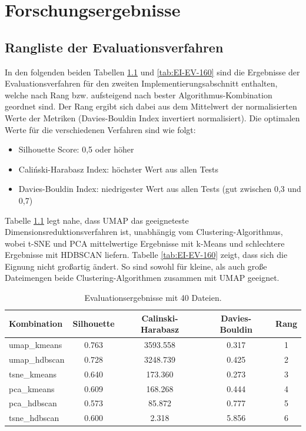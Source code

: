 \chapter{Forschungsergebnisse}

\section{Rangliste der Evaluationsverfahren}
In den folgenden beiden Tabellen \ref{tab:EI-EV-20} und \ref{tab:EI-EV-160} sind die Ergebnisse der Evaluationsverfahren für den zweiten Implementierungsabschnitt enthalten, welche nach Rang bzw. aufsteigend nach bester Algorithmus-Kombination geordnet sind. Der Rang ergibt sich dabei aus dem Mittelwert der normalisierten Werte der Metriken (Davies-Bouldin Index invertiert normalisiert). Die optimalen Werte für die verschiedenen Verfahren sind wie folgt:
\begin{itemize}
    \item Silhouette Score: 0,5 oder höher
    \item Caliński-Harabasz Index: höchster Wert aus allen Tests
    \item Davies-Bouldin Index: niedrigester Wert aus allen Tests (gut zwischen 0,3 und 0,7)
\end{itemize}
Tabelle \ref{tab:EI-EV-20} legt nahe, dass UMAP das geeigneteste Dimensionsreduktionsverfahren ist, unabhängig vom Clustering-Algorithmus, wobei t-SNE und PCA mittelwertige Ergebnisse mit k-Means und schlechtere Ergebnisse mit HDBSCAN liefern.
Tabelle \ref{tab:EI-EV-160} zeigt, dass sich die Eignung nicht großartig ändert. So sind sowohl für kleine, als auch große Dateimengen beide Clustering-Algorithmen zusammen mit UMAP geeignet.

\setlength{\tabcolsep}{5.5pt}
\begin{table}[h]
\centering
\begin{tabular}{lcccc}
\hline
\textbf{Kombination} & \textbf{Silhouette} & \textbf{Calinski-Harabasz} & \textbf{Davies-Bouldin} & \textbf{Rang} \\
\hline
umap\_kmeans    & 0.763 & 3593.558 & 0.317 & 1 \\
umap\_hdbscan   & 0.728 & 3248.739 & 0.425 & 2 \\
tsne\_kmeans    & 0.640 & 173.360  & 0.273 & 3 \\
pca\_kmeans     & 0.609 & 168.268  & 0.444 & 4 \\
pca\_hdbscan    & 0.573 & 85.872   & 0.777 & 5 \\
tsne\_hdbscan   & 0.600 & 2.318    & 5.856 & 6 \\
\hline
\end{tabular}
\caption{Evaluationsergebnisse mit 40 Dateien.}
\label{tab:EI-EV-20}
\end{table}


